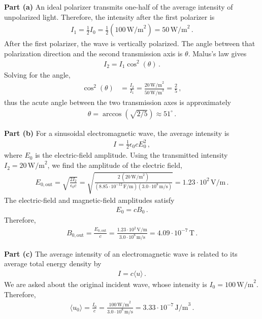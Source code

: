 \documentclass[11pt]{article}
\begin{document}
\noindent\textbf{Part (a)} An ideal polarizer transmits one-half of the average intensity of unpolarized light. Therefore, the intensity after the first polarizer is
\begin{align*}
I_1=\frac{1}{2}I_0
=\frac{1}{2}(100\,\text{W/m}^2)
=50\,\text{W/m}^2\,.
\end{align*}
After the first polarizer, the wave is vertically polarized. The angle between that polarization direction and the second transmission axis is $\theta$. Malus's law gives
\begin{align*}
I_2=I_1\cos^2(\theta)\,.
\end{align*}
Solving for the angle,
\begin{align*}
\cos^2(\theta)
&=\frac{I_2}{I_1}
=\frac{20\,\text{W/m}^2}{50\,\text{W/m}^2}
=\frac{2}{5}\,,
\end{align*}
thus the acute angle between the two transmission axes is approximately
\begin{align*}
\theta = \arccos\left(\sqrt{2/5}\right) \approx 51^\circ\,.
\end{align*}

\noindent\textbf{Part (b)} For a sinusoidal electromagnetic wave, the average intensity is
\begin{align*}
I=\frac{1}{2}\epsilon_0 cE_0^2\,,
\end{align*}
where $E_0$ is the electric-field amplitude. Using the transmitted intensity $I_2=20\,\text{W/m}^2$, we find the amplitude of the electric field,
\begin{align*}
E_{0,\text{out}}=\sqrt{\frac{2I_2}{\epsilon_0 c}}=\sqrt{\frac{2\,(20\,\text{W/m}^2)}
{(8.85\cdot 10^{-12}\,\text{F/m})(3.0\cdot 10^8\,\text{m/s})}}=1.23\cdot 10^2\,\text{V/m}\,.
\end{align*}
The electric-field and magnetic-field amplitudes satisfy
\begin{align*}
E_0=cB_0\,.
\end{align*}
Therefore,
\begin{align*}
B_{0,\text{out}}
=\frac{E_{0,\text{out}}}{c}
=\frac{1.23\cdot 10^2\,\text{V/m}}{3.0\cdot 10^8\,\text{m/s}}
=4.09\cdot 10^{-7}\,\text{T}\,.
\end{align*}

\noindent\textbf{Part (c)} The average intensity of an electromagnetic wave is related to its average total energy density by
\begin{align*}
I=c\langle u\rangle\,.
\end{align*}
We are asked about the original incident wave, whose intensity is $I_0=100\,\text{W/m}^2$. Therefore,
\begin{align*}
\langle u_0\rangle
=\frac{I_0}{c}
=\frac{100\,\text{W/m}^2}{3.0\cdot 10^8\,\text{m/s}}
=3.33\cdot 10^{-7}\,\text{J/m}^3\,.
\end{align*}
\end{document}
